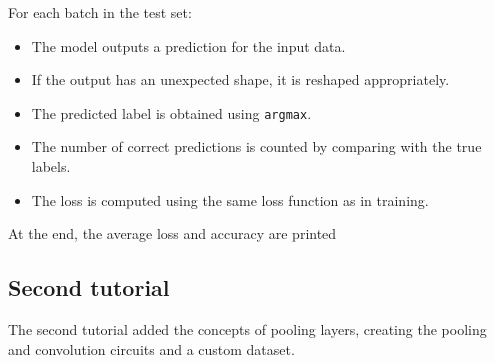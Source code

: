 \documentclass[conference]{IEEEtran}
\begin{document}
\begin{itemize}
    For each batch in the test set:
    \begin{itemize}
        \item The model outputs a prediction for the input data.
        \item If the output has an unexpected shape, it is reshaped appropriately.
        \item The predicted label is obtained using \texttt{argmax}.
        \item The number of correct predictions is counted by comparing with the true labels.
        \item The loss is computed using the same loss function as in training.
    \end{itemize}

    At the end, the average loss and accuracy are printed
\end{itemize}

\subsection*{\fontsize{16}{20}\selectfont Second tutorial}

The second tutorial added the concepts of pooling layers, creating the pooling and convolution circuits and a custom dataset.\\
\end{document}
